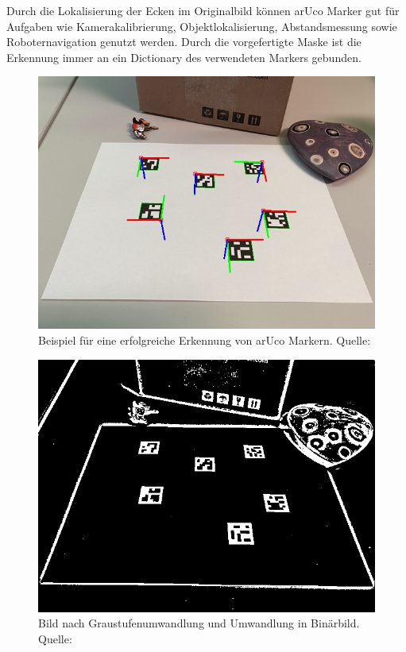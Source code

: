 Durch die Lokalisierung der Ecken im Originalbild können arUco Marker gut für Aufgaben wie Kamerakalibrierung, Objektlokalisierung, Abstandsmessung sowie Roboternavigation genutzt werden.
\cite[OpenCV arUco]{OpenCVaruco}
Durch die vorgefertigte Maske ist die Erkennung immer an ein Dictionary des verwendeten Markers gebunden. 

\begin{figure}
    \caption{Beispiel für eine erfolgreiche Erkennung von arUco Markern. Quelle: \cite[OpenCV]{OpenCVaruco}}\label{fig:aruco1}
    \includegraphics[width = \textwidth/2]{Bilder/singlemarkersaxes.jpg}
    \centering
\end{figure}

\begin{figure}
    \caption{Bild nach Graustufenumwandlung und Umwandlung in Binärbild. Quelle: \cite[OpenCV]{OpenCVaruco}}\label{fig:aruco2}
    \includegraphics[width = \textwidth /2]{Bilder/singlemarkersthresh.png}
    \centering
\end{figure}

